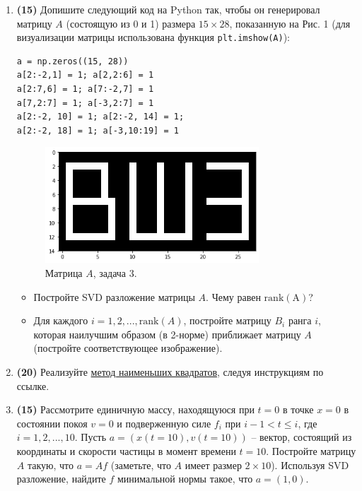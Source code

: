 \documentclass[prb,papersize=a4paper,notitlepage]{revtex4-1}%
\begin{document}
\begin{enumerate}
\item \textbf{(15)} Допишите следующий код на Python так, чтобы он генерировал матрицу $A$ (состоящую из 0 и 1) размера $15\times 28$, показанную на Рис. 1 (для визуализации матрицы использована функция \lstinline{plt.imshow(A)}):
\lstset{language=Python}
\lstset{frame=lines}
\lstset{basicstyle=\ttfamily}
\begin{lstlisting}
a = np.zeros((15, 28))
a[2:-2,1] = 1; a[2,2:6] = 1
a[2:7,6] = 1; a[7:-2,7] = 1
a[7,2:7] = 1; a[-3,2:7] = 1
a[2:-2, 10] = 1; a[2:-2, 14] = 1; 
a[2:-2, 18] = 1; a[-3,10:19] = 1
\end{lstlisting}
\begin{figure}[h!]
\includegraphics[width=8cm]{hse.png}
\caption{Матрица $A$, задача 3.}
\label{subs}
\end{figure}
\begin{itemize}
\item Постройте SVD разложение матрицы $A$. Чему равен $\mathrm{rank(A)}$?
\item Для каждого $i=1,2,...,\mathrm{rank}(A)$, постройте матрицу $B_i$ ранга $i$, которая наилучшим образом (в 2-норме) приближает матрицу $A$ (постройте соответствующее изображение). 
\end{itemize}

\item \textbf{(20)} Реализуйте \href{https://github.com/ev-br/CP2020/blob/master/week_3_lsq.ipynb}{метод наименьших квадратов}, следуя инструкциям по ссылке.

\item \textbf{(15)} 
Рассмотрите единичную массу, находящуюся при $t=0$ в точке $x=0$ в состоянии покоя $v=0$ и подверженную силе $f_i$ при $i-1< t \le i$, где $i=1,2,...,10$. Пусть $a=(x(t=10),v(t=10))$ -- вектор, состоящий из координаты и скорости частицы в момент времени $t=10$. Постройте матрицу $A$ такую, что $a=Af$ (заметьте, что $A$ имеет размер $2\times 10$). Используя SVD разложение, найдите $f$ минимальной нормы такое, что $a=(1,0)$.
\end{enumerate}
\end{document}
